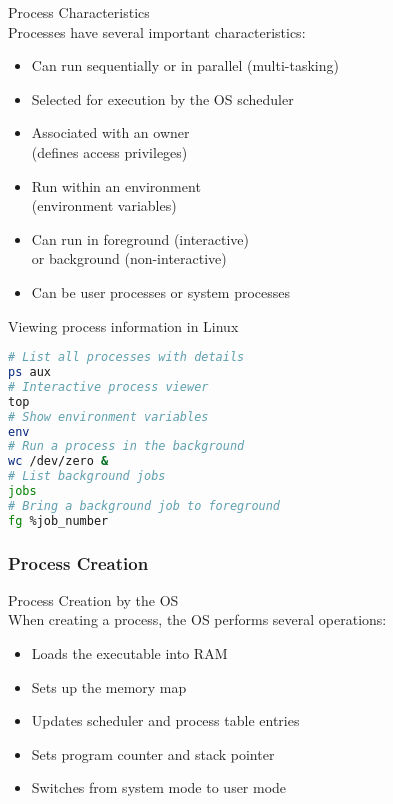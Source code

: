 \begin{definition}{Process Characteristics}\\
    Processes have several important characteristics:
    \begin{itemize}
        \item Can run sequentially or in parallel (multi-tasking)
        \item Selected for execution by the OS scheduler
        \item Associated with an owner \\ (defines access privileges)
        \item Run within an environment \\ (environment variables)
        \item Can run in foreground (interactive) \\ or background (non-interactive)
        \item Can be user processes or system processes
    \end{itemize}
\end{definition}

\begin{example2}{Viewing process information in Linux}
\begin{lstlisting}[language=bash, style=basesmol]
# List all processes with details
ps aux
# Interactive process viewer
top
# Show environment variables
env
# Run a process in the background
wc /dev/zero &
# List background jobs
jobs
# Bring a background job to foreground
fg %job_number
\end{lstlisting}
\end{example2}

\multend

\subsubsection{Process Creation}


\begin{definition}{Process Creation by the OS}\\
    When creating a process, the OS performs several operations:
    \begin{itemize}
        \item Loads the executable into RAM
        \item Sets up the memory map
        \item Updates scheduler and process table entries
        \item Sets program counter and stack pointer
        \item Switches from system mode to user mode
    \end{itemize}
\end{definition}

